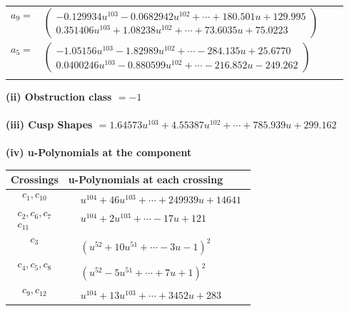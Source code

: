 \documentclass[1p]{elsarticle_modified}
\theoremstyle{definition}
\begin{document}
\begin{tabular}{m{7pt} m{180pt} m{7pt} m{180pt} }
\flushright $a_{9}=$&$\begin{pmatrix}-0.129934 u^{103}-0.0682942 u^{102}+\cdots+180.501 u+129.995\\0.351406 u^{103}+1.08238 u^{102}+\cdots+73.6035 u+75.0223\end{pmatrix}$ \\
\flushright $a_{5}=$&$\begin{pmatrix}-1.05156 u^{103}-1.82989 u^{102}+\cdots-284.135 u+25.6770\\0.0400246 u^{103}-0.880599 u^{102}+\cdots-216.852 u-249.262\end{pmatrix}$\\&\end{tabular}
\flushleft \textbf{(ii) Obstruction class $= -1$}\\~\\
\flushleft \textbf{(iii) Cusp Shapes $= 1.64573 u^{103}+4.55387 u^{102}+\cdots+785.939 u+299.162$}\\~\\
\newpage\renewcommand{\arraystretch}{1}
\flushleft \textbf{(iv) u-Polynomials at the component}\newline \\
\begin{tabular}{m{50pt}|m{274pt}}
Crossings & \hspace{64pt}u-Polynomials at each crossing \\
\hline $$\begin{aligned}c_{1},c_{10}\end{aligned}$$&$\begin{aligned}
&u^{104}+46 u^{103}+\cdots+249939 u+14641
\end{aligned}$\\
\hline $$\begin{aligned}c_{2},c_{6},c_{7}\\c_{11}\end{aligned}$$&$\begin{aligned}
&u^{104}+2 u^{103}+\cdots-17 u+121
\end{aligned}$\\
\hline $$\begin{aligned}c_{3}\end{aligned}$$&$\begin{aligned}
&(u^{52}+10 u^{51}+\cdots-3 u-1)^{2}
\end{aligned}$\\
\hline $$\begin{aligned}c_{4},c_{5},c_{8}\end{aligned}$$&$\begin{aligned}
&(u^{52}-5 u^{51}+\cdots+7 u+1)^{2}
\end{aligned}$\\
\hline $$\begin{aligned}c_{9},c_{12}\end{aligned}$$&$\begin{aligned}
&u^{104}+13 u^{103}+\cdots+3452 u+283
\end{aligned}$\\
\hline
\end{tabular}\\~\\
\end{document}

